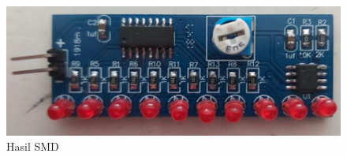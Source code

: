 \begin{figure}[H]
    \centering
    \includegraphics[width=0.8\linewidth]{P2/img/HasilSMD.png}
    \caption{Hasil SMD}
    \label{fig:HasilSMD}
\end{figure}